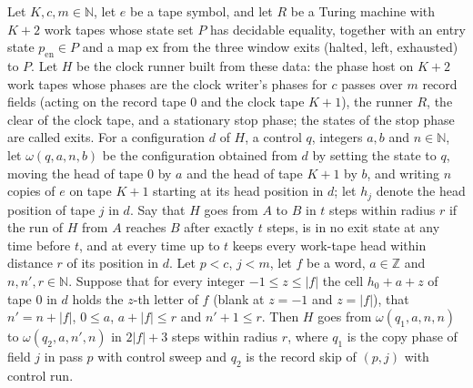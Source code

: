 \begin{lemma}
\label{Turing.cw_seg_copy}
\leanok
{}
Let $K,c,m\in\mathbb{N}$, let $e$ be a tape symbol, and let $R$ be a Turing machine with $K+2$
work tapes whose state set $P$ has decidable equality, together with an entry state
$p_{\mathrm{en}}\in P$ and a map $\mathrm{ex}$ from the three window exits (halted, left,
exhausted) to $P$. Let $H$ be the clock runner built from these data: the phase host on $K+2$
work tapes whose phases are the clock writer's phases for $c$ passes over $m$ record fields
(acting on the record tape $0$ and the clock tape $K+1$), the runner $R$, the clear of the
clock tape, and a stationary stop phase; the states of the stop phase are called exits. For a
configuration $d$ of $H$, a control $q$, integers $a,b$ and $n\in\mathbb{N}$, let
$\omega(q,a,n,b)$ be the configuration obtained from $d$ by setting the state to $q$, moving
the head of tape $0$ by $a$ and the head of tape $K+1$ by $b$, and writing $n$ copies of $e$ on
tape $K+1$ starting at its head position in $d$; let $h_j$ denote the head position of tape $j$
in $d$. Say that $H$ goes from $A$ to $B$ in $t$ steps within radius $r$ if the run of $H$ from
$A$ reaches $B$ after exactly $t$ steps, is in no exit state at any time before $t$, and at
every time up to $t$ keeps every work-tape head within distance $r$ of its position in $d$. Let
$p<c$, $j<m$, let $f$ be a word, $a\in\mathbb{Z}$ and $n,n',r\in\mathbb{N}$. Suppose that for
every integer $-1\le z\le|f|$ the cell $h_0+a+z$ of tape $0$ in $d$ holds the $z$-th letter of
$f$ (blank at $z=-1$ and $z=|f|$), that $n'=n+|f|$, $0\le a$, $a+|f|\le r$ and $n'+1\le r$.
Then $H$ goes from $\omega(q_1,a,n,n)$ to $\omega(q_2,a,n',n)$ in $2|f|+3$ steps within radius
$r$, where $q_1$ is the copy phase of field $j$ in pass $p$ with control sweep and $q_2$ is the
record skip of $(p,j)$ with control run.
\end{lemma}

